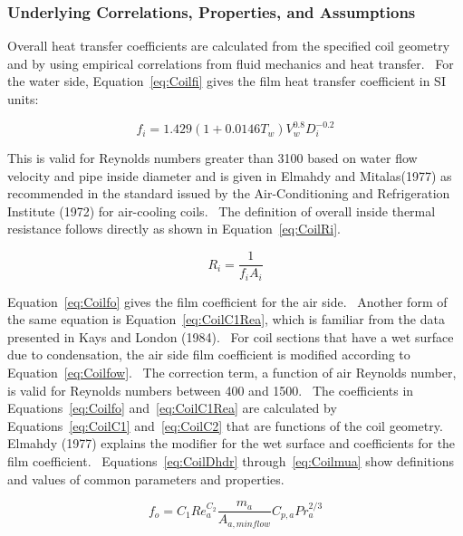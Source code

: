 \subsubsection{Underlying Correlations, Properties, and Assumptions}\label{underlying-correlations-properties-and-assumptions}

Overall heat transfer coefficients are calculated from the specified coil geometry and by using empirical correlations from fluid mechanics and heat transfer.~ For the water side, Equation~\ref{eq:Coilfi} gives the film heat transfer coefficient in SI units:

\begin{equation}
{f_i} = 1.429\left( {1 + 0.0146 {T_w}} \right)V_w^{0.8}D_i^{ - 0.2}
\label{eq:Coilfi}
\end{equation}

This is valid for Reynolds numbers greater than 3100 based on water flow velocity and pipe inside diameter and is given in Elmahdy and Mitalas(1977) as recommended in the standard issued by the Air-Conditioning and Refrigeration Institute (1972) for air-cooling coils.~ The definition of overall inside thermal resistance follows directly as shown in Equation~\ref{eq:CoilRi}.

\begin{equation}
{R_i} = \frac{1}{{{f_i}{A_i}}}
\label{eq:CoilRi}
\end{equation}

Equation~\ref{eq:Coilfo} gives the film coefficient for the air side.~ Another form of the same equation is Equation~\ref{eq:CoilC1Rea}, which is familiar from the data presented in Kays and London (1984).~ For coil sections that have a wet surface due to condensation, the air side film coefficient is modified according to Equation~\ref{eq:Coilfow}.~ The correction term, a function of air Reynolds number, is valid for Reynolds numbers between 400 and 1500.~ The coefficients in Equations~\ref{eq:Coilfo} and~\ref{eq:CoilC1Rea} are calculated by Equations~\ref{eq:CoilC1} and~\ref{eq:CoilC2} that are functions of the coil geometry.~ Elmahdy (1977) explains the modifier for the wet surface and coefficients for the film coefficient.~ Equations~\ref{eq:CoilDhdr} through~\ref{eq:Coilmua} show definitions and values of common parameters and properties.

\begin{equation}
  f_o = C_1 Re_a^{C_2} \frac{m_a}{A_{a,minflow}} C_{p,a} Pr_a^{2/3}
\label{eq:Coilfo}
\end{equation}

